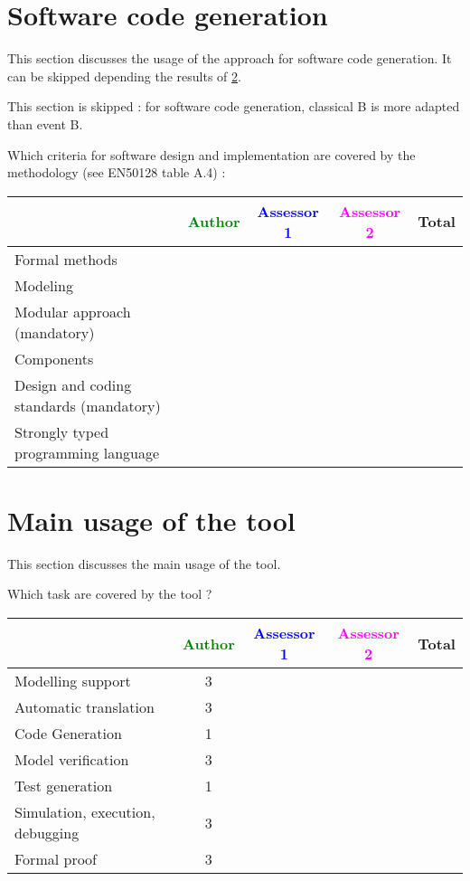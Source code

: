 \section{Software code generation}
This section discusses the usage of the approach for software code generation.
It can be skipped depending the results of \ref{main_usage}.


\begin{author}
This section is skipped :  for software code generation, classical B is more adapted than event B.
\end{author}


Which criteria for software design and implementation are covered by the methodology
(see EN50128 table A.4) :

\begin{tabular}{|l | c | c | c | c|}
\hline
& \textcolor{green}{Author} & \textcolor{blue}{Assessor 1} & \textcolor{magenta}{Assessor 2} & Total \\
\hline
Formal methods  & & & &  \\
\hline 
Modeling  & & & &  \\
\hline
Modular approach (mandatory) & & & &  \\
\hline
Components & & & &  \\
\hline
Design and coding standards (mandatory) & & & &  \\
\hline
Strongly typed programming language & & & &  \\
\hline

\end{tabular}



\section{Main usage of the tool}
\label{main_usage}

This section discusses the main usage of the tool.

Which task are covered by the tool ?


\begin{tabular}{|l | c | c | c | c|}
\hline
& \textcolor{green}{Author} & \textcolor{blue}{Assessor 1} & \textcolor{magenta}{Assessor 2} & Total \\
\hline 
Modelling support & 3 & & &  \\
\hline
Automatic translation  & 3 & & & \\
\hline
Code Generation  & 1 & & & \\
\hline
Model verification & 3 & & & \\
\hline
Test generation & 1 & & & \\
\hline
Simulation, execution, debugging & 3 & & & \\
\hline
Formal proof & 3 & & & \\
\hline
\end{tabular}

